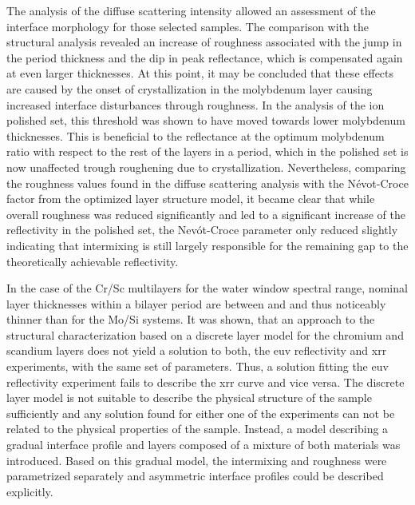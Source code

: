 The analysis of the diffuse scattering intensity allowed an assessment of the interface morphology for those selected samples. The comparison with the structural analysis revealed an increase of roughness associated with the jump in the period thickness and the dip in peak reflectance, which is compensated again at even larger thicknesses. At this point, it may be concluded that these effects are caused by the onset of crystallization in the molybdenum layer causing increased interface disturbances through roughness. In the analysis of the ion polished set, this threshold was shown to have moved towards lower molybdenum thicknesses. This is beneficial to the reflectance at the optimum molybdenum ratio with respect to the rest of the layers in a period, which in the polished set is now unaffected trough roughening due to crystallization. Nevertheless, comparing the roughness values found in the diffuse scattering analysis with the N{\'e}vot-Croce factor from the optimized layer structure model, it became clear that while overall roughness was reduced significantly and led to a significant increase of the reflectivity in the polished set, the Nev{\'o}t-Croce parameter only reduced slightly indicating that intermixing is still largely responsible for the remaining gap to the theoretically achievable reflectivity.

In the case of the Cr/Sc multilayers for the water window spectral range, nominal layer thicknesses within a bilayer period are between  and  and thus noticeably thinner than for the Mo/Si systems. It was shown, that an approach to the structural characterization based on a discrete layer model for the chromium and scandium layers does not yield a solution to both, the \gls{euv} reflectivity and \gls{xrr} experiments, with the same set of parameters. Thus, a solution fitting the \gls{euv} reflectivity experiment fails to describe the \gls{xrr} curve and vice versa. The discrete layer model is not suitable to describe the physical structure of the sample sufficiently and any solution found for either one of the experiments can not be related to the physical properties of the sample. Instead, a model describing a gradual interface profile and layers composed of a mixture of both materials was introduced. Based on this gradual model, the intermixing and roughness were parametrized separately and asymmetric interface profiles could be described explicitly.

